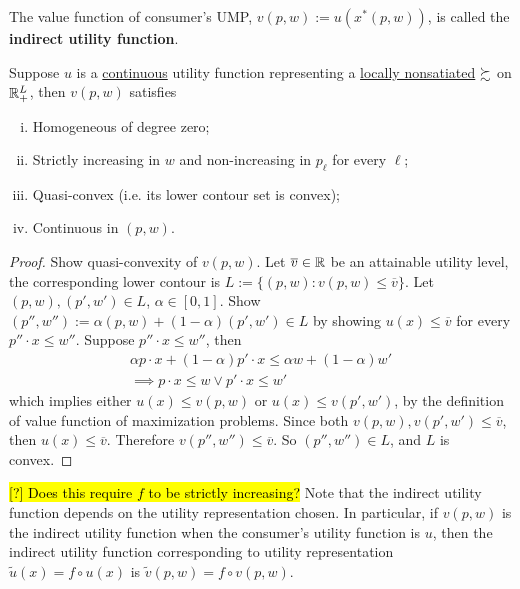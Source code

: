 \documentclass{report}
\begin{document}
 			\begin{definition}
 				The value function of consumer's UMP, $v(p, w) := u(x^*(p, w))$, is called the \textbf{indirect utility function}.
 			\end{definition}
 			
 			\begin{proposition}[3.D.3]
 				Suppose $u$ is a \ul{continuous} utility function representing a \ul{locally nonsatiated} $\succsim$ on $\mathbb{R}^L_+$, then $v(p, w)$ satisfies
 				\begin{enumerate}[(i)]
 					\item Homogeneous of degree zero;
 					\item Strictly increasing in $w$ and non-increasing in $p_\ell$ for every $\ell$;
 					\item Quasi-convex (i.e. its lower contour set is convex);
 					\item Continuous in $(p, w)$.
 				\end{enumerate}
 			\end{proposition}
 			
 			\begin{proof}
 				Show quasi-convexity of $v(p, w)$. Let $\overline{v} \in \mathbb{R}$ be an attainable utility level, the corresponding lower contour is $L :=\{(p, w) : v(p, w) \leq \overline{v}\}$. Let $(p, w), (p', w') \in L$, $\alpha \in [0, 1]$. Show $(p'', w'') := \alpha(p, w) + (1-\alpha)(p', w') \in L$ by showing $u(x) \leq \overline{v}$ for every $p'' \cdot x \leq w''$. Suppose $p'' \cdot x \leq w''$, then
 				\begin{align}
 					\alpha p \cdot x + (1-\alpha) p' \cdot x \leq \alpha w + (1-\alpha)w' \\
 					\implies p \cdot x \leq w \lor p' \cdot x \leq w'
 				\end{align}
 				which implies either $u(x) \leq v(p, w)$ or $u(x) \leq v(p' ,w')$, by the definition of value function of maximization problems. Since both $v(p,w), v(p',w') \leq \overline{v}$, then $u(x) \leq \overline{v}$. Therefore $v(p'', w'') \leq \overline{v}$. So $(p'', w'') \in L$, and $L$ is convex.
 			\end{proof}
 			
 			\begin{proposition}[Transformation on $v$]
 				\hl{[?] Does this require $f$ to be strictly increasing?}
 				Note that the indirect utility function depends on the utility representation chosen. In particular, if $v(p, w)$ is the indirect utility function when the consumer's utility function is $u$, then the indirect utility function corresponding to utility representation $\tilde{u}(x) = f \circ u(x)$ is $\tilde{v}(p, w) = f \circ v(p, w)$. 
 			\end{proposition}
 			
\end{document}
